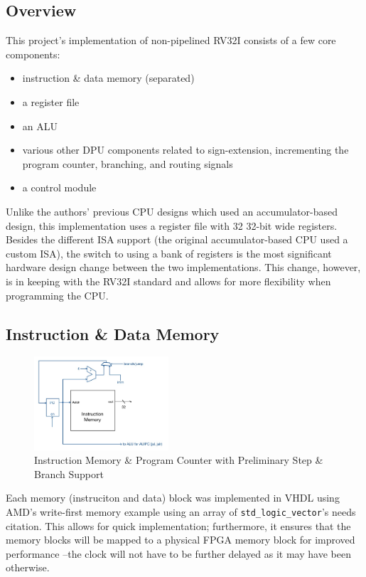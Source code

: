 \documentclass[lettersize,journal]{IEEEtran}
\begin{document}
\begin{itemize}
\subsection{Overview}
This project's implementation of non-pipelined RV32I consists of a few core components:
\begin{itemize}
    \item instruction \& data memory (separated)
    \item a register file
    \item an ALU
    \item various other DPU components related to sign-extension, incrementing the program counter, branching, and routing signals
    \item a control module
\end{itemize}
Unlike the authors' previous CPU designs which used an accumulator-based design, this implementation uses a register file with 32 32-bit wide registers.
Besides the different ISA support (the original accumulator-based CPU used a custom ISA),
the switch to using a bank of registers is the most significant hardware design change between the two implementations.
This change, however, is in keeping with the RV32I standard and allows for more flexibility when programming the CPU.

\subsection{Instruction \& Data Memory}
\begin{figure}[!h]
    \label{fig:instmemblock}
    \centering
    \includegraphics[width=5cm]{CPTR380_inst_mem.png}
    \caption{Instruction Memory \& Program Counter with Preliminary Step \& Branch Support}
\end{figure}
Each memory (instruciton and data) block was implemented in VHDL using AMD's write-first memory example using an array of \verb|std_logic_vector|'s \color{red}needs citation\color{black}.
This allows for quick implementation; furthermore, it ensures that the memory blocks will be mapped to a physical FPGA memory block for improved performance
--the clock will not have to be further delayed as it may have been otherwise.


\end{itemize}
\end{document}
